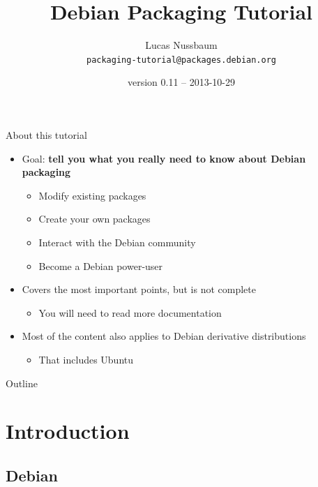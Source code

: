 \documentclass[10pt,final]{beamer}
\title{Debian Packaging Tutorial}
\author[]{Lucas Nussbaum\\{\small\texttt{packaging-tutorial@packages.debian.org}}}
\date{\footnotesize version 0.11 -- 2013-10-29} %
\begin{document}
\frame{\titlepage}

\begin{frame}{About this tutorial}
  \begin{itemize}
  \item Goal: \textbf{tell you what you really need to know about Debian packaging}
    \begin{itemize}
      \hbr
    \item Modify existing packages
      \hbr
    \item Create your own packages
	    \hbr
    \item Interact with the Debian community
      \hbr
    \item Become a Debian power-user
    \end{itemize}
    \br
  \item Covers the most important points, but is not complete
    \begin{itemize}
    \item You will need to read more documentation
    \end{itemize}
    \br
  \item Most of the content also applies to Debian derivative distributions
    \begin{itemize}
      \hbr
    \item That includes Ubuntu
    \end{itemize}
  \end{itemize}
\end{frame}

\begin{frame}{Outline}
  \tableofcontents[hideallsubsections]
\end{frame}

\section{Introduction}

\subsection{Debian}
\end{document}
